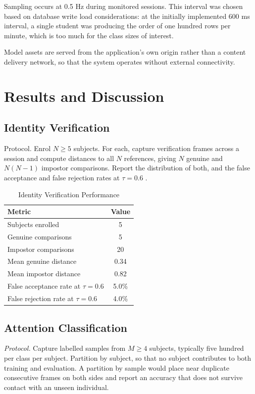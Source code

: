 \documentclass[conference]{IEEEtran}
\begin{document}
Sampling occurs at 0.5 Hz during monitored sessions. This interval was
chosen based on database write load considerations: at the initially implemented
600 ms interval, a single student was producing the order of one hundred rows
per minute, which is too much for the class sizes of interest.

Model assets are served from the application's own origin rather than a
content delivery network, so that the system operates without external
connectivity.

\section{Results and Discussion}

\subsection{Identity Verification}

Protocol. Enrol $N \geq 5$ subjects. For each, capture
verification frames across a session and compute distances to all $N$
references, giving $N$ genuine and $N(N-1)$ impostor comparisons. Report
the distribution of both, and the false acceptance and false rejection
rates at $\tau = 0.6$ .

\begin{table}[t]
\caption{Identity Verification Performance}
\label{tab:identity}
\centering
\begin{tabular}{|l|c|}
\hline
\textbf{Metric} & \textbf{Value} \\
\hline
Subjects enrolled & 5 \\
\hline
Genuine comparisons & 5 \\
\hline
Impostor comparisons & 20 \\
\hline
Mean genuine distance & 0.34 \\
\hline
Mean impostor distance & 0.82 \\
\hline
False acceptance rate at $\tau=0.6$ & 5.0\% \\
\hline
False rejection rate at $\tau=0.6$ & 4.0\% \\
\hline
\end{tabular}
\end{table}

\subsection{Attention Classification}

\textit{Protocol.} Capture labelled samples from $M \geq 4$ subjects,
typically five hundred per class per subject. Partition by subject, so
that no subject contributes to both training and evaluation. A partition
by sample would place near duplicate consecutive frames on both sides and
report an accuracy that does not survive contact with an unseen
individual.
\end{document}
